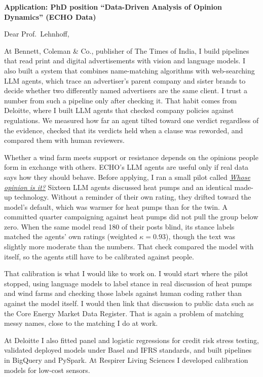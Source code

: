 \documentclass[11pt]{article}
\begin{document}

\textbf{Application: PhD position ``Data-Driven Analysis of Opinion Dynamics'' (ECHO Data)}

Dear Prof.\ Lehnhoff,

At Bennett, Coleman \& Co., publisher of The Times of India, I build pipelines that read print and digital advertisements with vision and language models. I also built a system that combines name-matching algorithms with web-searching LLM agents, which trace an advertiser's parent company and sister brands to decide whether two differently named advertisers are the same client. I trust a number from such a pipeline only after checking it. That habit comes from Deloitte, where I built LLM agents that checked company policies against regulations. We measured how far an agent tilted toward one verdict regardless of the evidence, checked that its verdicts held when a clause was reworded, and compared them with human reviewers.

Whether a wind farm meets support or resistance depends on the opinions people form in exchange with others. ECHO's LLM agents are useful only if real data says how they should behave. Before applying, I ran a small pilot called \href{https://github.com/obaidtoi/whose-opinion/blob/main/reports/pilot_report.pdf}{\emph{Whose opinion is it?}} Sixteen LLM agents discussed heat pumps and an identical made-up technology. Without a reminder of their own rating, they drifted toward the model's default, which was warmer for heat pumps than for the twin. A committed quarter campaigning against heat pumps did not pull the group below zero. When the same model read 180 of their posts blind, its stance labels matched the agents' own ratings (weighted $\kappa = 0.93$), though the text was slightly more moderate than the numbers. That check compared the model with itself, so the agents still have to be calibrated against people.

That calibration is what I would like to work on. I would start where the pilot stopped, using language models to label stance in real discussion of heat pumps and wind farms and checking those labels against human coding rather than against the model itself. I would then link that discussion to public data such as the Core Energy Market Data Register. That is again a problem of matching messy names, close to the matching I do at work.

At Deloitte I also fitted panel and logistic regressions for credit risk stress testing, validated deployed models under Basel and IFRS standards, and built pipelines in BigQuery and PySpark. At Respirer Living Sciences I developed calibration models for low-cost sensors.
\end{document}
